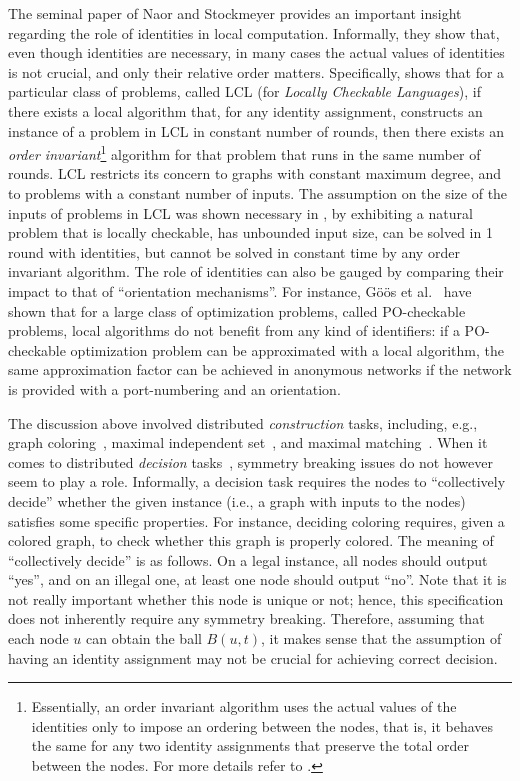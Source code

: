 \documentclass{llncs}
\begin{document}
The seminal paper of Naor and Stockmeyer \cite{NS93} provides an important insight regarding the role of identities in local computation. Informally, they show that, even though identities are necessary,  in many cases the actual values of identities is not crucial, and only their relative order matters. Specifically,  \cite{NS93} shows that for a particular class of problems, called LCL (for \emph{Locally Checkable Languages}), if there exists a local algorithm that, for any identity assignment, constructs an instance of a problem in LCL in constant number of rounds,  then there exists an \emph{order invariant}\footnote{Essentially, an order invariant algorithm uses the actual values of the identities only to impose an ordering between the nodes, that is, it behaves the same for any two identity assignments that preserve the total order between the nodes. For more details refer to \cite{NS93}.} algorithm  for that problem that  runs in the same number of rounds. LCL restricts its concern to graphs with constant maximum degree, and to problems with a constant number of inputs. The assumption on the size of the inputs of problems in LCL was shown necessary in \cite{HHRS12}, by exhibiting a natural problem that is locally checkable, has unbounded input size,  can be solved in 1 round with identities, but cannot be solved in constant time by any order invariant algorithm. The role of identities can also be gauged by comparing their impact to that of ``orientation mechanisms''.  For instance, G\"o\"os et al.~\cite{GHS12} have shown that for a large class of optimization problems, called PO-checkable problems, local algorithms do not benefit from any kind of identifiers: if a PO-checkable optimization problem can be approximated with a local algorithm, the same approximation factor can be achieved in anonymous networks if the network is provided with a port-numbering and an orientation.  

The discussion above involved distributed
\emph{construction} tasks, including, e.g., graph
coloring~\cite{BM09,K09,L92,NS93,PS96}, maximal independent
set~\cite{L92,PS96}, and maximal matching~\cite{HKP01,LPR09}. 
When it
comes to distributed \emph{decision} tasks~\cite{FKP11,FKPP12},
symmetry breaking issues do not however seem to play a
role. Informally, a decision task requires the nodes to ``collectively
decide'' whether the given instance (i.e., a graph with inputs to the
nodes) satisfies some specific properties. For instance, deciding
coloring requires, given a colored graph, to check whether this graph
is properly colored. The meaning of ``collectively decide'' is as
follows. On a legal instance, all nodes should output ``yes'', and on
an illegal one, at least one node should output ``no''. Note that it
is not really important whether this node is unique or not; hence, this
specification does not inherently require any symmetry
breaking. Therefore, assuming that each node $u$ can obtain the ball
$B(u,t)$, it makes sense that the assumption of having an identity
assignment may not be crucial for achieving correct decision.
\end{document}

